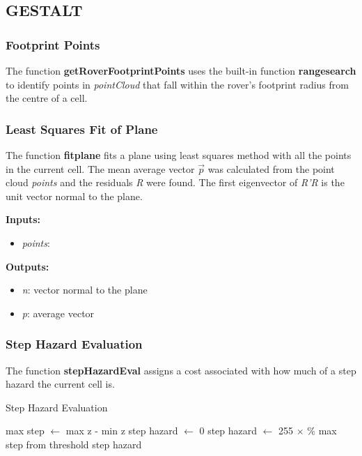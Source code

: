 \documentclass[Space3_Assign3.tex]{subfile}
\begin{document}
\subsection{GESTALT}

\subsubsection{Footprint Points}
The function \textbf{getRoverFootprintPoints} uses the built-in function \textbf{rangesearch} to identify points in \textit{pointCloud} that fall within the rover's footprint radius from the centre of a cell.

\subsubsection{Least Squares Fit of Plane}
The function \textbf{fitplane} fits a plane using least squares method with all the points in the current cell. The mean average vector $\vec{p}$ was calculated from the point cloud \textit{points} and the residuals \textit{R} were found. The first eigenvector of \textit{R'R} is the unit vector normal to the plane.

\textbf{Inputs:}
\begin{itemize}
\item \textit{points}: 
\end{itemize}
\textbf{Outputs:}
\begin{itemize}
\item \textit{n}: vector normal to the plane
\item \textit{p}: average vector
\end{itemize}

\subsubsection{Step Hazard Evaluation}
The function \textbf{stepHazardEval} assigns a cost associated with how much of a step hazard the current cell is. 

\begin{algorithm}
\caption{Step Hazard Evaluation} \label{PC:step}
\begin{algorithmic}
\State max step $\gets$ max z - min z
\State step hazard $\gets$ 0
\Else
\State step hazard $\gets$ 255 $\times$ \% max step from threshold
\EndIf
\Return step hazard
\end{algorithmic}
\end{algorithm}
\end{document}
